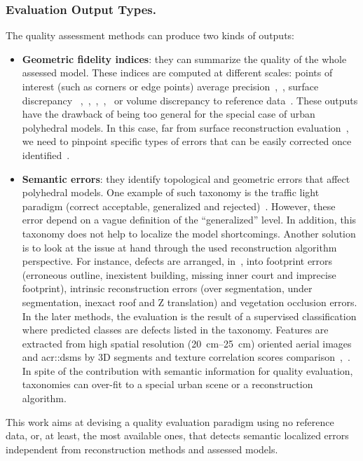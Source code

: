 \documentclass[runningheads]{llncs}
\begin{document}
\subsubsection{Evaluation Output Types.}
The quality assessment methods can produce two kinds of outputs:
\begin{itemize}
    \item \textbf{Geometric fidelity indices}: they can summarize the quality of the whole assessed model. These indices are computed at different scales: points of interest (such as corners or edge points) average precision~\cite{Kaartinen2005},~\cite{Voegtle2003}, surface discrepancy ~\cite{Kaartinen2005},~\cite{Henricsson1997},~\cite{Zeng2014},~\cite{Lafarge2012},~\cite{li2016boxfitting} or volume discrepancy to reference data~\cite{Zeng2014}. These outputs have the drawback of being too general for the special case of urban polyhedral models. In this case, far from surface reconstruction evaluation~\cite{berger2013benchmark}, we need to pinpoint specific types of errors that can be easily corrected once identified~\cite{OudeElberink2010}.
    \item \textbf{Semantic errors}: they identify topological and geometric errors that affect polyhedral models. One example of such taxonomy is the traffic light paradigm (correct acceptable, generalized and rejected)~\cite{boudet2006supervised}. However, these error depend on a vague definition of the ``generalized'' level. In addition, this taxonomy does not help to localize the model shortcomings. Another solution is to look at the issue at hand through the used reconstruction algorithm perspective. For instance, defects are arranged, in~\cite{Michelin2013}, into footprint errors (erroneous outline, inexistent building, missing inner court and imprecise footprint), intrinsic reconstruction errors (over segmentation, under segmentation, inexact roof and Z translation) and vegetation occlusion errors. In the later methods, the evaluation is the result of a supervised classification where predicted classes are defects listed in the taxonomy. Features are extracted from high spatial resolution (\SIrange{20}{25}{\cm}) oriented aerial images and \glspl{acr::dsm} by 3D segments and texture correlation scores comparison~\cite{boudet2006supervised},~\cite{Michelin2013}. In spite of the contribution with semantic information for quality evaluation, taxonomies can over-fit to a special urban scene or a reconstruction algorithm.
\end{itemize}

This work aims at devising a quality evaluation paradigm using no reference data, or, at least, the most available ones, that detects semantic localized errors independent from reconstruction methods and assessed models.
\end{document}
